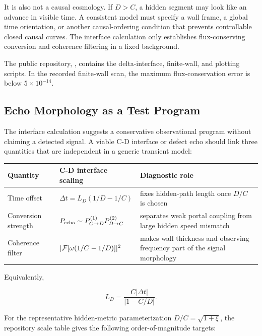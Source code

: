 \documentclass[11pt]{article}
\begin{document}
It is also not a causal cosmology. If \(D>C\), a hidden segment may look like an advance in visible time. A consistent model must specify a wall frame, a global time orientation, or another causal-ordering condition that prevents controllable closed causal curves. The interface calculation only establishes flux-conserving conversion and coherence filtering in a fixed background.


The public repository, , contains the delta-interface, finite-wall, and plotting scripts. In the recorded finite-wall scan, the maximum flux-conservation error is below \(5\times10^{-14}\).


\subsection{Echo Morphology as a Test Program}


The interface calculation suggests a conservative observational program without claiming a detected signal. A viable C-D interface or defect echo should link three quantities that are independent in a generic transient model:


\begin{center}
\small
\begin{tabularx}{\textwidth}{@{}>{\raggedright\arraybackslash}p{} >{\raggedright\arraybackslash}p{} >{\raggedright\arraybackslash}p{}@{}}
\toprule
Quantity & C-D interface scaling & Diagnostic role \\
\midrule
Time offset & \(\Delta t=L_D(1/D-1/C)\) & fixes hidden-path length once \(D/C\) is chosen \\
Conversion strength & \(P_{\rm echo}\sim P_{C\to D}^{(1)}P_{D\to C}^{(2)}\) & separates weak portal coupling from large hidden speed mismatch \\
Coherence filter & \(|{\cal F}[\omega(1/C-1/D)]|^2\) & makes wall thickness and observing frequency part of the signal morphology \\
\bottomrule
\end{tabularx}
\end{center}


Equivalently,


\[
L_D=\frac{C|\Delta t|}{|1-C/D|}.
\]


For the representative hidden-metric parameterization \(D/C=\sqrt{1+\xi}\), the repository scale table gives the following order-of-magnitude targets:
\end{document}
